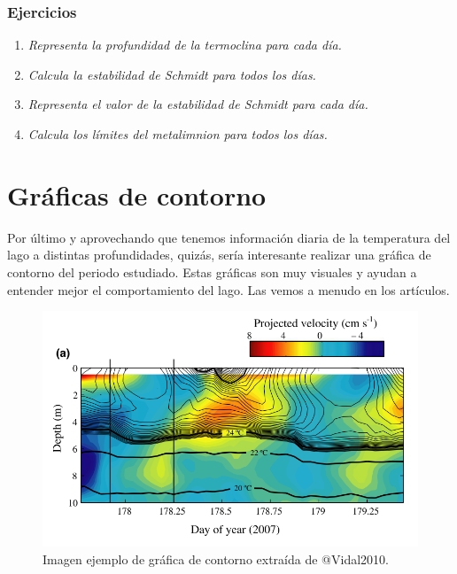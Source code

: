 \documentclass[
]{book}
\providecommand{\tightlist}{%
  \setlength{\itemsep}{0pt}\setlength{\parskip}{0pt}}
\begin{document}
\hypertarget{ejercicios-6}{%
\subsection{Ejercicios}\label{ejercicios-6}}

\begin{enumerate}
\def\labelenumi{\arabic{enumi}.}
\tightlist
\item
  \emph{Representa la profundidad de la termoclina para cada día.}
\item
  \emph{Calcula la estabilidad de Schmidt para todos los días.}
\item
  \emph{Representa el valor de la estabilidad de Schmidt para cada día.}
\item
  \emph{Calcula los límites del metalimnion para todos los días.}
\end{enumerate}

\hypertarget{Contour}{%
\chapter{Gráficas de contorno}\label{Contour}}

Por último y aprovechando que tenemos información diaria de la temperatura del lago a distintas profundidades, quizás, sería interesante realizar una gráfica de contorno del periodo estudiado. Estas gráficas son muy visuales y ayudan a entender mejor el comportamiento del lago. Las vemos a menudo en los artículos.

\begin{figure}

{\centering \includegraphics[width=1\linewidth]{Img/Imagen_ContourPlot} 

}

\caption{Imagen ejemplo de gráfica de contorno extraída de @Vidal2010.}\label{fig:unnamed-chunk-66}
\end{figure}
\end{document}
